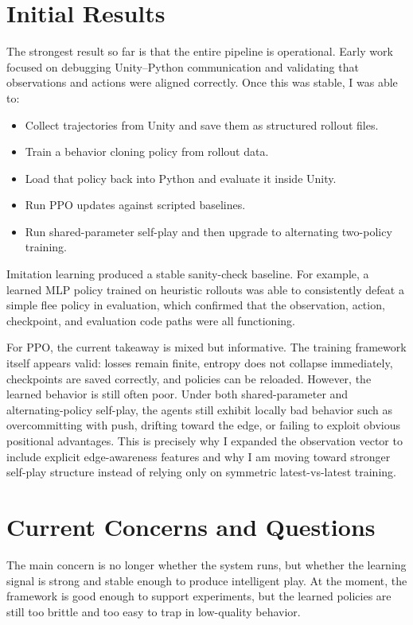 \documentclass[10pt,twocolumn,letterpaper]{article}
\begin{document}
\section{Initial Results}

The strongest result so far is that the entire pipeline is operational. Early work focused on debugging Unity--Python communication and validating that observations and actions were aligned correctly. Once this was stable, I was able to:

\begin{itemize}
    \item Collect trajectories from Unity and save them as structured rollout files.
    \item Train a behavior cloning policy from rollout data.
    \item Load that policy back into Python and evaluate it inside Unity.
    \item Run PPO updates against scripted baselines.
    \item Run shared-parameter self-play and then upgrade to alternating two-policy training.
\end{itemize}

Imitation learning produced a stable sanity-check baseline. For example, a learned MLP policy trained on heuristic rollouts was able to consistently defeat a simple flee policy in evaluation, which confirmed that the observation, action, checkpoint, and evaluation code paths were all functioning.

For PPO, the current takeaway is mixed but informative. The training framework itself appears valid: losses remain finite, entropy does not collapse immediately, checkpoints are saved correctly, and policies can be reloaded. However, the learned behavior is still often poor. Under both shared-parameter and alternating-policy self-play, the agents still exhibit locally bad behavior such as overcommitting with push, drifting toward the edge, or failing to exploit obvious positional advantages. This is precisely why I expanded the observation vector to include explicit edge-awareness features and why I am moving toward stronger self-play structure instead of relying only on symmetric latest-vs-latest training.

\section{Current Concerns and Questions}

The main concern is no longer whether the system runs, but whether the learning signal is strong and stable enough to produce intelligent play. At the moment, the framework is good enough to support experiments, but the learned policies are still too brittle and too easy to trap in low-quality behavior.
\end{document}
